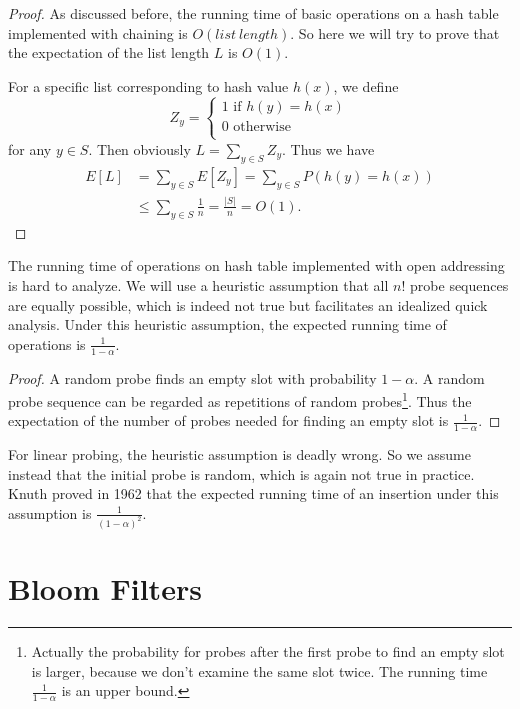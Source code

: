 \begin{proof}
As discussed before, the running time of basic operations on a hash table implemented with chaining is $O(list\:length)$. So here we will try to prove that the expectation of the list length $L$ is $O(1)$. 

For a specific list corresponding to hash value $h(x)$, we define 
\begin{equation*}
Z_y=\begin{cases}
1\text{ if }h(y)=h(x)\\
0\text{ otherwise}\\
\end{cases}
\end{equation*}
for any $y\in S$. Then obviously $L=\sum\limits_{y\in S}Z_y$. Thus we have
\begin{align*}
E[L]&= \sum\limits_{y\in S}E[Z_y]=\sum\limits_{y\in S}P(h(y)=h(x))\\
&\leq\sum\limits_{y\in S}\frac{1}{n}=\frac{\lvert S\rvert}{n}=O(1).
\end{align*}
\end{proof}
The running time of operations on hash table implemented with open addressing is hard to analyze. We will use a heuristic assumption that all $n!$ probe sequences are equally possible, which is indeed not true but facilitates an idealized quick analysis. Under this heuristic assumption, the expected running time of operations is $\frac{1}{1-\alpha}$. 
\begin{proof}
A random probe finds an empty slot with probability $1-\alpha$. A random probe sequence can be regarded as repetitions of random probes\footnote{Actually the probability for probes after the first probe to find an empty slot is larger, because we don't examine the same slot twice. The running time $\frac{1}{1-\alpha}$ is an upper bound.}. Thus the expectation of the number of probes needed for finding an empty slot is $\frac{1}{1-\alpha}$.
\end{proof}
For linear probing, the heuristic assumption is deadly wrong. So we assume instead that the initial probe is random, which is again not true in practice. Knuth proved in 1962 that the expected running time of an insertion under this assumption is $\frac{1}{(1-\alpha)^2}$.
\section{Bloom Filters}
\ifx\PREAMBLE\undefined

\fi